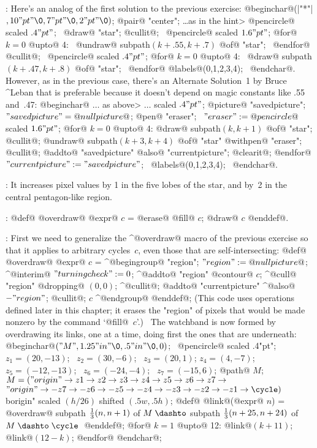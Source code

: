 :
 Here's an analog of the first solution to the previous
exercise:
\begindisplay
@beginchar@\kern1pt(|"*"|$,10"pt"\0,7"pt"\0,2"pt"\0)$;\cr
@pair@ "center"; \dots  \<as in the hint>\cr
\pickup @pencircle@ scaled $.4"pt"$; \ @draw@ "star";\cr
@cullit@; \ \pickup @pencircle@ scaled $1.6"pt"$;\cr
@for@ $k=0$ @upto@ 4:
 \ @undraw@ subpath$(k+.55,k+.7)$ @of@ "star"; \ @endfor@\cr
@cullit@; \ \pickup @pencircle@ scaled $.4"pt"$;\cr
@for@ $k=0$ @upto@ 4: \ @draw@ subpath$(k+.47,k+.8)$ @of@ "star"; \ @endfor@\cr
@labels@(0,1,2,3,4); \ @endchar@.\cr
\enddisplay
However, as in the previous case, there's an Alternate Solution~1
by Bruce ^{Leban} that is preferable because it doesn't depend
on magic constants like .55 and~.47:
\begindisplay
@beginchar@ $\ldots$ \<as above> $\ldots$ scaled $.4"pt"$;\cr
@picture@ "savedpicture"; \ $"savedpicture"=@nullpicture@$;\cr
@pen@ "eraser"; \ $"eraser":=@pencircle@$ scaled $1.6"pt"$;\cr
@for@ $k=0$ @upto@ 4:\cr
\indent @draw@ subpath$(k,k+1)$ @of@ "star"; @cullit@;\cr
\indent @undraw@ subpath$(k+3,k+4)$ @of@ "star" @withpen@ "eraser"; @cullit@;\cr
\indent @addto@ "savedpicture" @also@ "currentpicture"; @clearit@; @endfor@\cr
$"currentpicture":="savedpicture"$; \ @labels@(0,1,2,3,4); \ @endchar@.\cr
\enddisplay

:
 It increases pixel values by 1 in the five lobes of the star, and by~2
in the central pentagon-like region.

:
 @def@ @overdraw@ @expr@ $c$ = @erase@ @fill@ $c$; @draw@ $c$ @enddef@.

:
 First we need to generalize the ^@overdraw@ macro of the previous
exercise so that it applies to arbitrary cycles~$c$, even those that are
self-intersecting:
\begindisplay
@def@ @overdraw@ @expr@ $c$ = ^@begingroup@\cr
\indent@picture@ "region"; $"region":=@nullpicture@$;\cr
\indent^@interim@ $"turningcheck":=0$; ^@addto@ "region" @contour@ $c$;\cr
\indent^@cull@ "region" @dropping@ $(0,0)$;\cr
\indent^@cullit@; @addto@ "currentpicture" ^@also@ $-"region"$; @cullit@;\cr
\indent@draw@ $c$ ^@endgroup@ @enddef@;\cr
\enddisplay
(This code uses operations defined later in this chapter; it erases the
"region" of pixels that would be made nonzero by the command `@fill@~$c$'.)
\ The watchband is now formed by overdrawing its links, one at a time,
doing first the ones that are underneath:
\begindisplay
@beginchar@$("M",1.25"in"\0,.5"in"\0,0)$; \
 \pickup @pencircle@ scaled .4"pt";\cr
$z_1=(20,-13)$; \ $z_2=(30,-6)$; \ $z_3=(20,1)$; $z_4=(4,-7)$;\cr
\indent $z_5=(-12,-13)$; \ $z_6=(-24,-4)$; \ $z_7=(-15,6)$;\cr
@path@ $M$; $M=("origin"\to z1\to z2\to z3\to z4\to z5\to z6\to z7\to$\cr
\indent$"origin"\to -z7\to -z6\to -z5\to -z4\to -z3\to -z2\to -z1\to\cycle)$\cr
^^"origin" \indent\indent scaled $(h/26)$ shifted $(.5w,.5h)$;\cr
@def@ @link@(@expr@ $n$) =\cr
\indent @overdraw@ subpath ${1\over3}(n,n+1)$ of $M\;\dashto$\cr
\indent\indent  subpath ${1\over3}(n+25,n+24)$ of $M\;\dashto\;\cycle\;$
 @enddef@;\cr
@for@ $k=1$ @upto@ 12: @link@$(k+11)$; @link@$(12-k)$; @endfor@
@endchar@;\cr
\enddisplay


